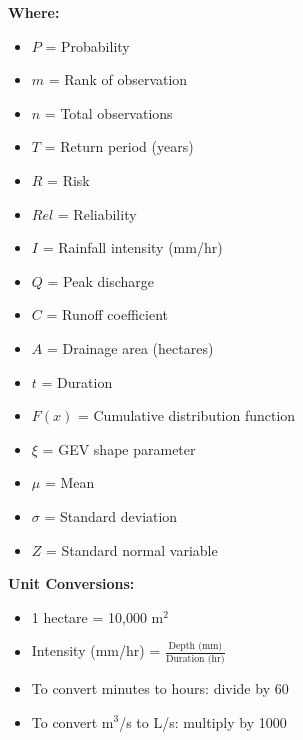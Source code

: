 \documentclass[11pt,a4paper]{article}
\begin{document}
\textbf{Where:}
\begin{multicols}{2}
\begin{itemize}[nosep]
    \item $P$ = Probability
    \item $m$ = Rank of observation
    \item $n$ = Total observations
    \item $T$ = Return period (years)
    \item $R$ = Risk
    \item $Rel$ = Reliability
    \item $I$ = Rainfall intensity (mm/hr)
    \item $Q$ = Peak discharge
    \item $C$ = Runoff coefficient
    \item $A$ = Drainage area (hectares)
    \item $t$ = Duration
    \item $F(x)$ = Cumulative distribution function
    \item $\xi$ = GEV shape parameter
    \item $\mu$ = Mean
    \item $\sigma$ = Standard deviation
    \item $Z$ = Standard normal variable
\end{itemize}
\end{multicols}

\vspace{0.5cm}

\textbf{Unit Conversions:}
\begin{itemize}[nosep]
    \item 1 hectare = 10,000 m$^2$
    \item Intensity (mm/hr) = $\frac{\text{Depth (mm)}}{\text{Duration (hr)}}$
    \item To convert minutes to hours: divide by 60
    \item To convert m$^3$/s to L/s: multiply by 1000
\end{itemize}
\end{document}
